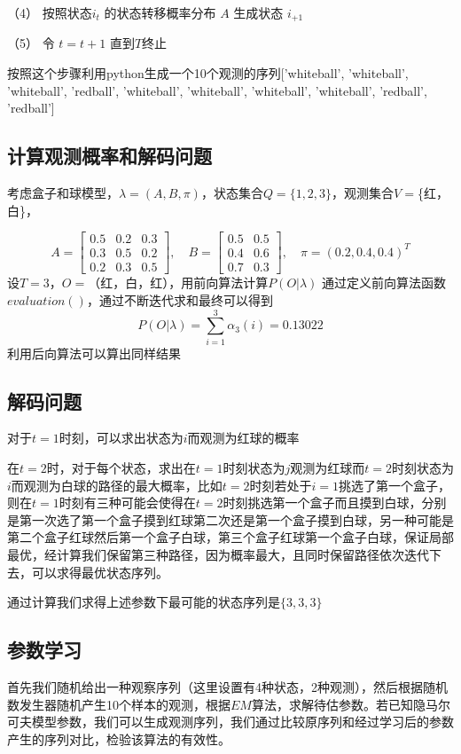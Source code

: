 \documentclass[a4paper,12pt]{ctexart}     %
\begin{document}
	（4） 按照状态$ i_t $ 的状态转移概率分布 $ A $ 生成状态 $ i_{+1} $
	
	（5）  令   $ t = t+1 $ 直到$ T $终止
	
	按照这个步骤利用python生成一个10个观测的序列['whiteball', 'whiteball', 'whiteball', 'redball', 'whiteball', 'whiteball', 'whiteball', 'whiteball', 'redball', 'redball']
	
\subsection{计算观测概率和解码问题}
考虑盒子和球模型，$ \lambda = (A,B,\pi) $，状态集合$ Q = \{1,2,3\} $，观测集合$ V =$\{红，白\}，

$$A = 
\begin{bmatrix} 
	0.5&0.2&0.3\\
	0.3&0.5&0.2\\ 
	0.2&0.3&0.5
\end{bmatrix} ,\quad
B= 
\begin{bmatrix}
	0.5&0.5\\
	0.4&0.6\\
	0.7&0.3
\end{bmatrix},\quad
\pi = (0.2,0.4,0.4)^T
$$
设$ T=3 $，$ O= $（红，白，红），用前向算法计算$ P(O|\lambda) $
通过定义前向算法函数$ evaluation() $，通过不断迭代求和最终可以得到
$$
P(O|\lambda) = \sum\limits_{i=1}^3\alpha_3(i) = 0.13022
$$
利用后向算法可以算出同样结果 

\subsection{解码问题}
对于$ t=1 $时刻，可以求出状态为$ i $而观测为红球的概率  

在$ t=2 $时，对于每个状态，求出在$ t=1 $时刻状态为$ j $观测为红球而$ t=2 $时刻状态为$ i $而观测为白球的路径的最大概率，比如$ t=2 $时刻若处于$ i=1 $挑选了第一个盒子，则在$ t=1 $时刻有三种可能会使得在$ t=2 $时刻挑选第一个盒子而且摸到白球，分别是第一次选了第一个盒子摸到红球第二次还是第一个盒子摸到白球，另一种可能是第二个盒子红球然后第一个盒子白球，第三个盒子红球第一个盒子白球，保证局部最优，经计算我们保留第三种路径，因为概率最大，且同时保留路径依次迭代下去，可以求得最优状态序列。

通过计算我们求得上述参数下最可能的状态序列是$ \{3,3,3\} $
\subsection{参数学习}
首先我们随机给出一种观察序列（这里设置有4种状态，2种观测），然后根据随机数发生器随机产生10个样本的观测，根据$ EM $算法，求解待估参数。若已知隐马尔可夫模型参数，我们可以生成观测序列，我们通过比较原序列和经过学习后的参数产生的序列对比，检验该算法的有效性。
\end{document}
